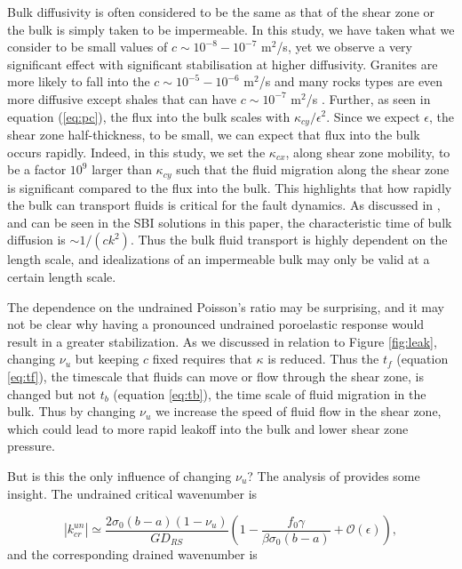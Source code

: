 \documentclass[draft]{agujournal2019}
\begin{document}
Bulk diffusivity is often considered to be the same as that of the shear zone or the bulk is simply taken to be impermeable. In this study, we have taken what we consider to be small values of $c \sim 10^{-8} - 10^{-7}$ m$^2$/s, yet we observe a very significant effect with significant stabilisation at higher diffusivity. Granites are more likely to fall into the $c \sim 10^{-5} - 10^{-6}$ m$^2$/s and many rocks types are even more diffusive except shales that can have $c \sim  10^{-7}$ m$^2$/s \cite{Cheng2016}. Further, as seen in equation (\ref{eq:pc}), the flux into the bulk scales with $\kappa_{cy}/\epsilon^2$. Since we expect $\epsilon$, the shear zone half-thickness, to be small, we can expect that flux into the bulk occurs rapidly. Indeed, in this study, we set the $\kappa_{cx}$, along shear zone mobility, to be a factor $10^9$ larger than $\kappa_{cy}$ such that the fluid migration along the shear zone is significant compared to the flux into the bulk. This highlights that how rapidly the bulk can transport fluids is critical for the fault dynamics. As discussed in , and can be seen in the SBI solutions in this paper, the characteristic time of bulk diffusion is $\sim 1/(c k^2)$. Thus the bulk fluid transport is highly dependent on the length scale, and idealizations of an impermeable bulk may only be valid at a certain length scale.

The dependence on the undrained Poisson's ratio may be surprising, and it may not be clear why having a pronounced undrained poroelastic response would result in a greater stabilization. As we discussed in relation to Figure \ref{fig:leak}, changing $\nu_u$ but keeping $c$ fixed requires that $\kappa$ is reduced. Thus the $t_f$ (equation \ref{eq:tf}), the timescale that fluids can move or flow through the shear zone, is changed but not $t_b$ (equation \ref{eq:tb}), the time scale of fluid migration in the bulk. Thus by changing $\nu_u$ we increase the speed of fluid flow in the shear zone, which could lead to more rapid leakoff into the bulk and lower shear zone pressure. 

But is this the only influence of changing $\nu_u$? The analysis of  provides some insight. The undrained critical wavenumber is 

\begin{equation}
|k_{cr}^{un}| \simeq \frac{2 \sigma_0(b-a)(1-\nu_u)}{GD_{RS}} \left(1 - \frac{f_0 \gamma}{ \beta \sigma_0 (b-a) } + \mathcal{O}(\epsilon) \right) ,
\label{eq:kappa0un} 
\end{equation}
and the corresponding drained wavenumber is 
\end{document}
